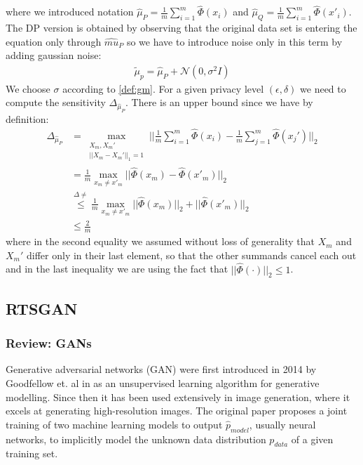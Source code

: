 where we introduced notation $\hat{\mu}_P = \frac{1}{m} \sum_{i=1}^m \hat{\Phi}(x_i)$ and $\hat{\mu}_Q = \frac{1}{m} \sum_{i=1}^m \hat{\Phi}(x'_i)$. The DP version is obtained by observing that the original data set is entering the equation only through $\hat{mu}_P$ so we have to introduce noise only in this term by adding gaussian noise:
\begin{align}
    \tilde{\mu}_p = \hat{\mu}_P + \mathcal{N}(0, \sigma^2 I)
\end{align}
We choose $\sigma$ according to \cref{def:gm}. For a given privacy level $(\epsilon, \delta)$ we need to compute the sensitivity $\Delta_{\hat{\mu}_P}$. There is an upper bound since we have by definition:
\begin{align}
    \Delta_{\hat{\mu}_P} &= \max_{\substack{X_m,X_m' \\ ||X_m-X_m'||_1=1}} || \frac{1}{m} \sum_{i=1}^m \hat{\Phi}(x_i) - \frac{1}{m} \sum_{j=1}^m \hat{\Phi}(x_j') ||_2 \nonumber \\
    &= \frac{1}{m} \max_{x_m \neq x'_m} || \hat{\Phi}(x_m) - \hat{\Phi}(x'_m)||_2 \nonumber \\
    &\overset{\Delta \neq}{\leq} \frac{1}{m} \max_{x_m \neq x'_m} || \hat{\Phi}(x_m) ||_2 + ||\hat{\Phi}(x'_m)||_2 \nonumber \\
    &\leq \frac{2}{m} 
\end{align}
where in the second equality we assumed without loss of generality that $X_m$ and $X_m'$ differ only in their last element, so that the other summands cancel each out and in the last inequality we are using the fact that $||\hat{\Phi}(\cdot)||_2 \leq 1$.



\subsection{RTSGAN} 

\subsubsection{Review: GANs}
Generative adversarial networks (GAN) were first introduced in 2014 by Goodfellow et. al in \parencite{gan_og} as an unsupervised learning algorithm for generative modelling. Since then it has been used extensively in image generation, where it excels at generating high-resolution images. The original paper proposes a joint training of two machine learning models to output $\hat{p}_{model}$, usually neural networks, to implicitly model the unknown data distribution $p_{data}$ of a given training set. 

